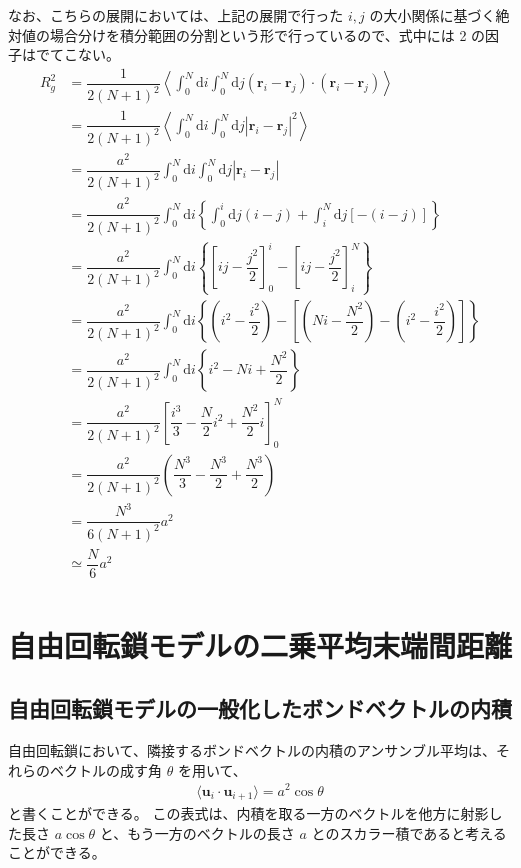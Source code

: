 \documentclass[uplatex,dvipdfmx,a4paper,11pt, titlepage]{jsarticle}
\newcommand{\diff}{\mathrm d}
\begin{document}
\begin{appendix}
なお、こちらの展開においては、上記の展開で行った $i , j$ の大小関係に基づく絶対値の場合分けを積分範囲の分割という形で行っているので、式中には 2 の因子はでてこない。
\begin{align*}
R_g^2 
	&= \dfrac{1}{2(N+1)^2} \left \langle \int_{0}^N \diff i \int_{0}^N \diff j (\bm{r}_i - \bm{r}_j) \cdot (\bm{r}_i - \bm{r}_j) \right \rangle\\
	&= \dfrac{1}{2(N+1)^2} \left \langle \int_{0}^N \diff i \int_{0}^{N} \diff j \left|\bm{r}_i - \bm{r}_j \right|^2 \right \rangle\\
	&= \dfrac{a^2}{2(N+1)^2} \int_{0}^N \diff i \int_{0}^{N} \diff j \left|\bm{r}_i - \bm{r}_j \right| \\
	&= \dfrac{a^2}{2(N+1)^2} \int_{0}^N \diff i \left\{ \int_{0}^{i} \diff j (i -j) + \int_i^N \diff j \left[ -(i-j) \right] \right\} \\
	&= \dfrac{a^2}{2(N+1)^2} \int_{0}^N \diff i \left\{ \left [ij - \dfrac{j^2}{2} \right]_0^i - \left[ ij - \dfrac{j^2}{2} \right]_i^N \right\} \\
	&= \dfrac{a^2}{2(N+1)^2} \int_{0}^N \diff i \left\{ \left (i^2 - \dfrac{i^2}{2} \right) - \left[ \left(Ni - \dfrac{N^2}{2} \right) - \left (i^2 - \dfrac{i^2}{2} \right) \right] \right\} \\
	&= \dfrac{a^2}{2(N+1)^2} \int_{0}^N \diff i \left\{ i^2 - Ni + \dfrac{N^2}{2} \right\} \\
	&= \dfrac{a^2}{2(N+1)^2} \left[ \dfrac{i^3}{3} - \dfrac{N}{2}i^2 + \dfrac{N^2}{2} i \right]_0^N \\
	&= \dfrac{a^2}{2(N+1)^2} \left( \dfrac{N^3}{3} - \dfrac{N^3}{2} + \dfrac{N^3}{2} \right) \\
	&= \dfrac{N^3 }{6(N+1)^2} a^2\\
	&\simeq \dfrac{N}{6} a^2\\
\end{align*}
\newpage

\section{自由回転鎖モデルの二乗平均末端間距離}
\label{sec:1FR_R2}

\subsection{自由回転鎖モデルの一般化したボンドベクトルの内積}

自由回転鎖において、隣接するボンドベクトルの内積のアンサンブル平均は、それらのベクトルの成す角 $\theta$ を用いて、
\begin{align*}
	\langle \bm{u}_i \cdot \bm{u}_{i+1} \rangle = a^2 \cos \theta 
\end{align*} 
と書くことができる。
この表式は、内積を取る一方のベクトルを他方に射影した長さ $a \cos \theta$ と、もう一方のベクトルの長さ $a$ とのスカラー積であると考えることができる。


\end{appendix}
\end{document}
